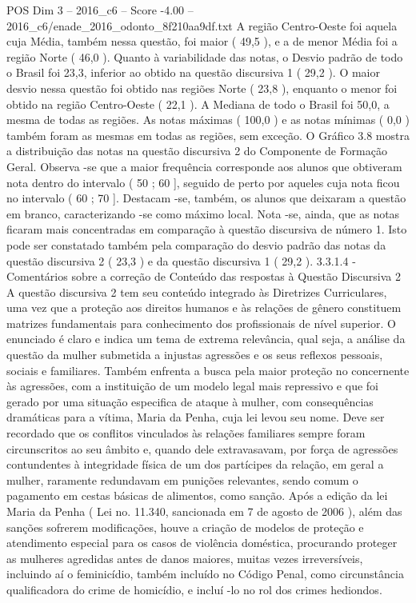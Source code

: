 \begin{textsample}{POS Dim 3 – 2016\_c6 – Score -4.00 – 2016\_c6/enade\_2016\_odonto\_8f210aa9df.txt}
A região Centro-Oeste foi aquela cuja Média, também nessa questão, foi maior ( 49,5 ), e a de menor Média foi a região Norte ( 46,0 ).
Quanto à variabilidade das notas, o Desvio padrão de todo o Brasil foi 23,3, inferior ao obtido na questão discursiva 1 ( 29,2 ).
O maior desvio nessa questão foi obtido nas regiões Norte ( 23,8 ), enquanto o menor foi obtido na região Centro-Oeste ( 22,1 ).
A Mediana de todo o Brasil foi 50,0, a mesma de todas as regiões.
As notas máximas ( 100,0 ) e as notas mínimas ( 0,0 ) também foram as mesmas em todas as regiões, sem exceção.
O Gráfico 3.8 mostra a distribuição das notas na questão discursiva 2 do Componente de Formação Geral.
Observa -se que a maior frequência corresponde aos alunos que obtiveram nota dentro do intervalo ( 50 ; 60 ], seguido de perto por aqueles cuja nota ficou no intervalo ( 60 ; 70 ].
Destacam -se, também, os alunos que deixaram a questão em branco, caracterizando -se como máximo local.
Nota -se, ainda, que as notas ficaram mais concentradas em comparação à questão discursiva de número 1.
Isto pode ser constatado também pela comparação do desvio padrão das notas da questão discursiva 2 ( 23,3 ) e da questão discursiva 1 ( 29,2 ). 3.3.1.4 - Comentários sobre a correção de Conteúdo das respostas à Questão Discursiva 2 A questão discursiva 2 tem seu conteúdo integrado às Diretrizes Curriculares, uma vez que a proteção aos direitos humanos e às relações de gênero constituem matrizes fundamentais para conhecimento dos profissionais de nível superior.
O enunciado é claro e indica um tema de extrema relevância, qual seja, a análise da questão da mulher submetida a injustas agressões e os seus reflexos pessoais, sociais e familiares.
Também enfrenta a busca pela maior proteção no concernente às agressões, com a instituição de um modelo legal mais repressivo e que foi gerado por uma situação especifica de ataque à mulher, com consequências dramáticas para a vítima, Maria da Penha, cuja lei levou seu nome.
Deve ser recordado que os conflitos vinculados às relações familiares sempre foram circunscritos ao seu âmbito e, quando dele extravasavam, por força de agressões contundentes à integridade física de um dos partícipes da relação, em geral a mulher, raramente redundavam em punições relevantes, sendo comum o pagamento em cestas básicas de alimentos, como sanção.
Após a edição da lei Maria da Penha ( Lei no. 11.340, sancionada em 7 de agosto de 2006 ), além das sanções sofrerem modificações, houve a criação de modelos de proteção e atendimento especial para os casos de violência doméstica, procurando proteger as mulheres agredidas antes de danos maiores, muitas vezes irreversíveis, incluindo aí o feminicídio, também incluído no Código Penal, como circunstância qualificadora do crime de homicídio, e incluí -lo no rol dos crimes hediondos.

\end{textsample}
